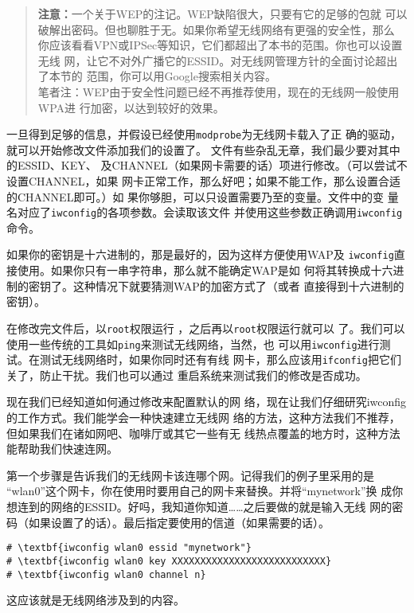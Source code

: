 \begin{quote}
  \textbf{注意：}一个关于WEP的注记。WEP缺陷很大，只要有它的足够的包就
  可以破解出密码。但也聊胜于无。如果你希望无线网络有更强的安全性，那么
  你应该看看VPN或IPSec等知识，它们都超出了本书的范围。你也可以设置无线
  网，让它不对外广播它的ESSID。对无线网管理方针的全面讨论超出了本节的
  范围，你可以用Google搜索相关内容。
  \\
  笔者注：WEP由于安全性问题已经不再推荐使用，现在的无线网一般使用WPA进
  行加密，以达到较好的效果。
\end{quote}

一旦得到足够的信息，并假设已经使用\texttt{modprobe}为无线网卡载入了正
确的驱动，就可以开始修改文件添加我们的设置了。
文件有些杂乱无章，我们最少要对其中的ESSID、KEY、
及CHANNEL（如果网卡需要的话）项进行修改。（可以尝试不设置CHANNEL，如果
网卡正常工作，那么好吧；如果不能工作，那么设置合适的CHANNEL即可。）如
果你够胆，可以只设置需要乃至的变量。文件中的变
量名对应了\texttt{iwconfig}的各项参数。会读取该文件
并使用这些参数正确调用\texttt{iwconfig}命令。

如果你的密钥是十六进制的，那是最好的，因为这样方便使用WAP及
\texttt{iwconfig}直接使用。如果你只有一串字符串，那么就不能确定WAP是如
何将其转换成十六进制的密钥了。这种情况下就要猜测WAP的加密方式了（或者
直接得到十六进制的密钥）。

在修改完文件后，以\texttt{root}权限运行
，之后再以\texttt{root}权限运行就可以
了。我们可以使用一些传统的工具如\texttt{ping}来测试无线网络，当然，也
可以用\texttt{iwconfig}进行测试。在测试无线网络时，如果你同时还有有线
网卡，那么应该用\texttt{ifconfig}把它们关了，防止干扰。我们也可以通过
重启系统来测试我们的修改是否成功。

现在我们已经知道如何通过修改来配置默认的网
络，现在让我们仔细研究iwconfig的工作方式。我们能学会一种快速建立无线网
络的方法，这种方法我们不推荐，但如果我们在诸如网吧、咖啡厅或其它一些有无
线热点覆盖的地方时，这种方法能帮助我们快速连网。

第一个步骤是告诉我们的无线网卡该连哪个网。记得我们的例子里采用的是
``wlan0''这个网卡，你在使用时要用自己的网卡来替换。并将``mynetwork''换
成你想连到的网络的ESSID。好吗，我知道你知道……之后要做的就是输入无线
网的密码（如果设置了的话）。最后指定要使用的信道（如果需要的话）。
\begin{Verbatim}[frame=single,commandchars=\\\{\}]
# \textbf{iwconfig wlan0 essid "mynetwork"}
# \textbf{iwconfig wlan0 key XXXXXXXXXXXXXXXXXXXXXXXXXXX}
# \textbf{iwconfig wlan0 channel n}
\end{Verbatim}
这应该就是无线网络涉及到的内容。

